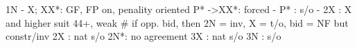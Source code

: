 1N - X;
XX*: GF, FP on, penality oriented
P* ->XX*: forced
        - P* : s/o
        - 2X : X and higher suit 44+, weak
        # if opp. bid, then 2N = inv, X = t/o, bid = NF but constr/inv
2X : nat s/o
2N*: no agreement
3X : nat s/o
3N : s/o